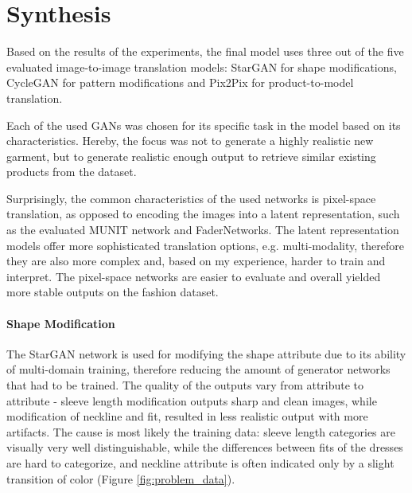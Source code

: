 \documentclass[12pt]{report}
\begin{document}
\section{Synthesis}
Based on the results of the experiments, the final model uses three out of the five evaluated image-to-image translation models: StarGAN for shape modifications, CycleGAN for pattern modifications and Pix2Pix for product-to-model translation. 

Each of the used GANs was chosen for its specific task in the model based on its characteristics. Hereby, the focus was not to generate a highly realistic new garment, but to generate realistic enough output to retrieve similar existing products from the dataset.

Surprisingly, the common characteristics of the used networks is pixel-space translation, as opposed to encoding the images into a latent representation, such as the evaluated MUNIT network and FaderNetworks. The latent representation models offer more sophisticated translation options, e.g. multi-modality, therefore they are also more complex and, based on my experience, harder to train and interpret. The pixel-space networks are easier to evaluate and overall yielded more stable outputs on the fashion dataset.

\paragraph{Shape Modification}
The StarGAN network is used for modifying the shape attribute due to its ability of multi-domain training, therefore reducing the amount of generator networks that had to be trained. The quality of the outputs vary from attribute to attribute - sleeve length modification outputs sharp and clean images, while modification of neckline and fit, resulted in less realistic output with more artifacts. The cause is most likely the training data: sleeve length categories are visually very well distinguishable, while the differences between fits of the dresses are hard to categorize, and neckline attribute is often indicated only by a slight transition of color (Figure \ref{fig:problem_data}).
\end{document}
